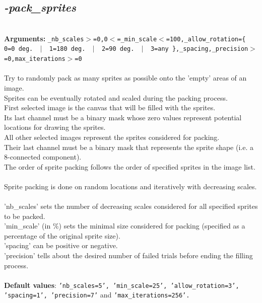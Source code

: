 \documentclass[a4paper,11pt,twoside]{book}
\begin{document}
\subsection{\emph{-pack\_sprites} }\vspace*{-0.5em}
~\\\textbf{Arguments: } 
{\small \texttt{\_nb\_scales$>$=0,0$<$=\_min\_scale$<$=100,\_allow\_rotation=\{ 0=0 deg. ~$|$~ 1=180 deg. ~$|$~ 2=90 deg. ~$|$~ 3=any \},\_spacing,\_precision$>$=0,max\_iterations$>$=0}}\\~\\
Try to randomly pack as many sprites as possible onto the 'empty' areas of an image.
~\\Sprites can be eventually rotated and scaled during the packing process.
~\\First selected image is the canvas that will be filled with the sprites.
~\\Its last channel must be a binary mask whose zero values represent potential locations for drawing the sprites.
~\\All other selected images represent the sprites considered for packing.
~\\Their last channel must be a binary mask that represents the sprite shape (i.e. a 8-connected component).
~\\The order of sprite packing follows the order of specified sprites in the image list.
~\\Sprite packing is done on random locations and iteratively with decreasing scales.
~\\'nb\_scales' sets the number of decreasing scales considered for all specified sprites to be packed.
~\\'min\_scale' (in \%) sets the minimal size considered for packing (specified as a percentage of the original sprite size).
~\\'spacing' can be positive or negative.
~\\'precision' tells about the desired number of failed trials before ending the filling process.
~\\~\\\textbf{Default values}: {\small \texttt{'nb\_scales=5', 'min\_scale=25', 'allow\_rotation=3', 'spacing=1', 'precision=7'} and \texttt{'max\_iterations=256'.}}
\end{document}
